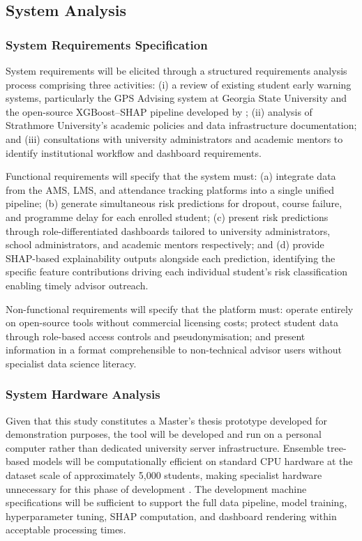 \documentclass[12pt]{report}
\begin{document}
\subsection{System Analysis}

\subsubsection{System Requirements Specification}

System requirements will be elicited through a structured requirements analysis process
comprising three activities: (i) a review of existing student early warning systems,
particularly the GPS Advising system at Georgia State University
\parencite{georgia2024gps} and the open-source XGBoost--SHAP pipeline developed
by \parencite{bettahi2025}; (ii) analysis of Strathmore University's academic
policies and data infrastructure documentation; and (iii) consultations with
university administrators and academic mentors to identify institutional workflow
and dashboard requirements.

Functional requirements will specify that the system must: (a) integrate data from the
AMS, LMS, and attendance tracking platforms into a single unified pipeline; (b)
generate simultaneous risk predictions for dropout, course failure, and programme
delay for each enrolled student; (c) present risk predictions through role-differentiated
dashboards tailored to university administrators, school administrators, and academic
mentors respectively; and (d) provide SHAP-based explainability outputs alongside each
prediction, identifying the specific feature contributions driving each individual
student's risk classification enabling timely advisor outreach.

Non-functional requirements will specify that the platform must: operate entirely on
open-source tools without commercial licensing costs; protect student data through
role-based access controls and pseudonymisation; and present information in a
format comprehensible to non-technical advisor users without specialist data
science literacy.

\subsubsection{System Hardware Analysis}

Given that this study constitutes a Master's thesis prototype developed for
demonstration purposes, the tool will be developed and run on a personal
computer rather than dedicated university server infrastructure. Ensemble
tree-based models will be computationally efficient on standard CPU hardware at
the dataset scale of approximately 5,000 students, making specialist hardware
unnecessary for this phase of development \parencite{bettahi2025}. The
development machine specifications will be sufficient to support the full data
pipeline, model training, hyperparameter tuning, SHAP computation, and
dashboard rendering within acceptable processing times. 
\end{document}
